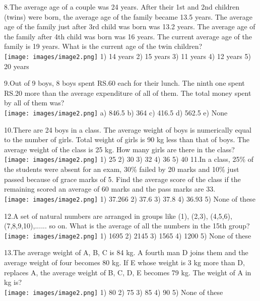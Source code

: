 \documentclass[
]{article}
\begin{document}
8.The average age of a couple was 24 years. After their 1st and 2nd children (twins) were born, the average age of the family became 13.5 years. The average age of the family just after 3rd child was born was 13.2 years. The average age of the family after 4th child was born was 16 years. The current average age of the family is 19 years. What is the current age of the twin children?   \\
\texttt{[image: images/image2.png]}   1) 14 years 	2) 15 years 	3) 11 years 	4) 12 years 	5) 20 years

9.Out of 9 boys, 8 boys spent RS.60 each for their lunch. The ninth one spent RS.20 more than the average expenditure of all of them. The total money spent by all of them was?   \\
\texttt{[image: images/image2.png]}   	a) 846.5 	b) 364 	c) 416.5 	d) 562.5 	e) None

10.There are 24 boys in a class. The average weight of boys is numerically equal to the number of girls. Total weight of girls is 90 kg less than that of boys. The average weight of the class is 25 kg. How many girls are there in the class?  \\
\texttt{[image: images/image2.png]}    1) 25 	2) 30 	3) 32 	4) 36 	5) 40
\newpage
11.In a class, 25\% of the students were absent for an exam, 30\% failed by 20 marks and 10\% just passed because of grace marks of 5. Find the average score of the class if the remaining scored an average of 60 marks and the pass marks are 33.   \\
\texttt{[image: images/image2.png]}   1) 37.266 	2) 37.6 	3) 37.8 	4) 36.93 	5) None of these
	
12.A set of natural numbers are arranged in groups like (1), (2,3), (4,5,6), (7,8,9,10),...... so on. What is the average of all the numbers in the 15th group?   \\
\texttt{[image: images/image2.png]}   1) 1695 	2) 2145 	3) 1565 	4) 1200 	5) None of these

13.The average weight of A, B, C is 84 kg. A fourth man D joins them and the average weight of four becomes 80 kg. If E whose weight is 3 kg more than D, replaces A, the average 	weight of B, C, D, E becomes 79 kg. The weight of A in kg is?   \\
\texttt{[image: images/image2.png]}   1) 80 	2) 75 	3) 85 	4) 90 	5) None of these
\end{document}
